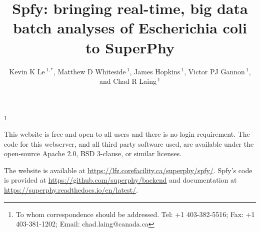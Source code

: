 \documentclass[a4paper, onecolumn]{NAR}
\begin{document}
\title{Spfy: bringing real-time, big data batch analyses of Escherichia coli to SuperPhy}

\author{%
Kevin K Le\,$^{1, *}$,
Matthew D Whiteside\,$^{1}$,
James Hopkins\,$^{1}$,
Victor PJ Gannon\,$^{1}$,
and Chad R Laing\,$^{1}$}
\footnote{To whom correspondence should be addressed.
Tel: +1 403-382-5516; Fax: +1 403-381-1202; Email: chad.laing@canada.ca}

\address{%
$^{1}$National Microbiology Laboratory at Lethbridge, Public Health Agency of Canada, Twp Rd 9-1, Lethbridge, AB, T1J 3Z4, Canada}

\maketitle


This website is free and open to all users and there is no login requirement. The code for this webserver, and all third party software used, are available under the open-source Apache 2.0, BSD 3-clause, or similar licenses. \par

The website is available at \url{https://lfz.corefacility.ca/superphy/spfy/}. Spfy's code is provided at \url{https://github.com/superphy/backend} and documentation at \url{https://superphy.readthedocs.io/en/latest/}. \par
\end{document}
